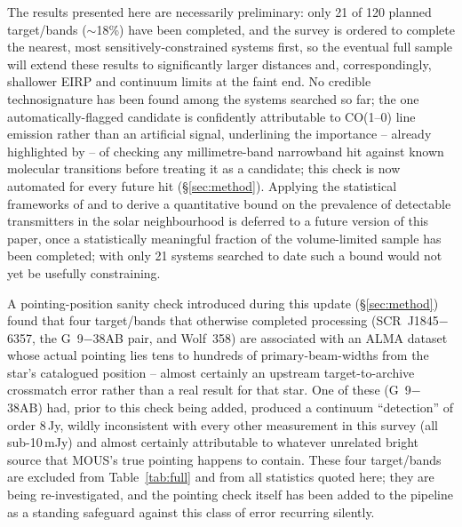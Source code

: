 \documentclass{openjournal}
\begin{document}
The results presented here are necessarily preliminary: only 21 of 120
planned target/bands ($\sim$18\%) have been completed, and the survey is
ordered to complete the nearest, most sensitively-constrained systems
first, so the eventual full sample will extend these results to
significantly larger distances and, correspondingly, shallower EIRP and
continuum limits at the faint end. No credible technosignature has been
found among the systems searched so far; the one automatically-flagged
candidate is confidently attributable to CO(1--0) line emission rather
than an artificial signal, underlining the importance -- already
highlighted by \citet{Mason2024} -- of checking any millimetre-band
narrowband hit against known molecular transitions before treating it as
a candidate; this check is now automated for every future hit
(\S\ref{sec:method}). Applying the statistical frameworks of
\citet{Wright2018} and \citet{Margot2023} to derive a quantitative bound
on the prevalence of detectable transmitters in the solar neighbourhood
is deferred to a future version of this paper, once a statistically
meaningful fraction of the volume-limited sample has been completed;
with only 21 systems searched to date such a bound would not yet be
usefully constraining.

A pointing-position sanity check introduced during this update
(\S\ref{sec:method}) found that four target/bands that otherwise
completed processing (SCR~J1845$-$6357, the G~9$-$38AB pair, and
Wolf~358) are associated with an ALMA dataset whose actual pointing lies
tens to hundreds of primary-beam-widths from the star's catalogued
position -- almost certainly an upstream target-to-archive crossmatch
error rather than a real result for that star. One of these (G~9$-$38AB)
had, prior to this check being added, produced a continuum ``detection''
of order 8\,Jy, wildly inconsistent with every other measurement in this
survey (all sub-10\,mJy) and almost certainly attributable to whatever
unrelated bright source that MOUS's true pointing happens to contain.
These four target/bands are excluded from Table~\ref{tab:full} and from
all statistics quoted here; they are being re-investigated, and the
pointing check itself has been added to the pipeline as a standing
safeguard against this class of error recurring silently.
\end{document}

